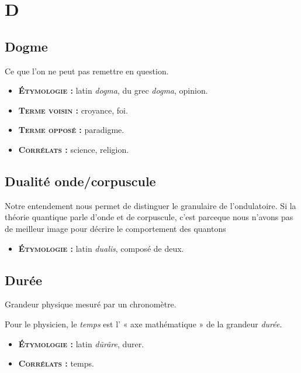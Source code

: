 \chapter{D}
\section{Dogme}

Ce que l'on ne peut pas remettre en question.

{\footnotesize
\begin{itemize}[leftmargin=1cm, label=, itemsep=1pt]
\item {\bf \textsc{Étymologie} :} latin {\it dogma}, du grec {\it dogma}, opinion.
\item {\bf \textsc{Terme voisin} :} croyance, foi.
\item {\bf \textsc{Terme opposé} :} paradigme.
\item {\bf \textsc{Corrélats} :} science, religion.
\end{itemize}
}

\section{Dualité onde/corpuscule}

Notre entendement nous permet de distinguer le granulaire de l'ondulatoire.
Si la théorie quantique parle d'onde et de corpuscule,
c'est parceque nous n'avons pas de meilleur image pour décrire le comportement des quantons

{\footnotesize
\begin{itemize}[leftmargin=1cm, label=, itemsep=1pt]
\item {\bf \textsc{Étymologie} :} latin {\it dualis}, composé de deux.
\end{itemize}
}

\section{Durée}

Grandeur physique mesuré par un chronomètre.

Pour le physicien, le {\it temps} est l' « axe mathématique »
de la grandeur {\it durée}.

{\footnotesize
\begin{itemize}[leftmargin=1cm, label=, itemsep=1pt]
\item {\bf \textsc{Étymologie} :} latin {\it d\~{u}r\~{a}re}, durer.
\item {\bf \textsc{Corrélats} :} temps.
\end{itemize}
}
